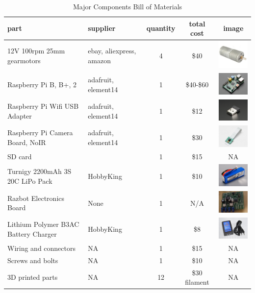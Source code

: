 \documentclass[12pt,titlepage,oneside]{memoir}
\begin{document}
\begin{table}[!h]
\begin{tabular}{p{4cm} | p{3.5cm} | c | c | c}
part & supplier &  quantity &   total cost & image\\
\hline
12V 100rpm 25mm gearmotors & ebay, aliexpress, amazon&  4  & \$40 & \includegraphics[width=80px]{picture/motor.png}\\
Raspberry Pi B, B+, 2 & adafruit, element14 & 1 & \$40-\$60 & \includegraphics[width=80px]{picture/pi.jpg}\\
Raspberry Pi Wifi USB Adapter & adafruit, element14 & 1 & \$12 & \includegraphics[width=80px]{picture/piwifi.jpg}\\
Raspberry Pi Camera Board, NoIR & adafruit, element14 & 1 & \$30 &  \includegraphics[width=80px]{picture/picam.jpg}\\
SD card & & 1 & \$15 & NA\\
Turnigy 2200mAh 3S 20C LiPo Pack & HobbyKing & 1 & \$10 &  \includegraphics[width=80px]{picture/lipo.jpg}\\
Razbot Electronics Board & None & 1 & N/A &  \includegraphics[width=80px]{picture/piboard.jpg}\\
Lithium Polymer B3AC Battery Charger & HobbyKing & 1 & \$8 & \includegraphics[width=80px]{picture/charger.jpg}\\
Wiring and connectors & NA & 1 & \$15 & NA \\
Screws and bolts & NA &1 & \$10 & NA \\
3D printed parts & NA & 12 & \$30 filament & NA \\
\end{tabular}
\caption{Major Components Bill of Materials}
\label{table:BOM}
\end{table}
\end{document}
